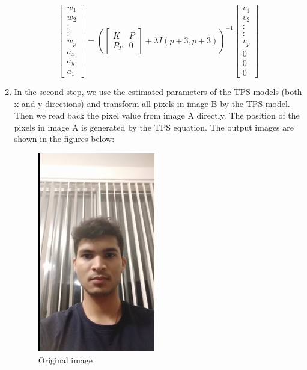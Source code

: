 \documentclass[conference]{IEEEtran}
\begin{document}
\begin{enumerate}
\begin{equation}
\begin{bmatrix}
w_1\\
w_2\\
:\\
:\\
w_p\\
a_x\\
a_y\\
a_1
\end{bmatrix}
=
(
\begin{bmatrix}
K & P \\
P_T & 0
\end{bmatrix}
+ \lambda I(p+3, p+3))^{-1}
\begin{bmatrix}
v_1\\
v_2\\
:\\
:\\
v_p\\
0\\
0\\
0
\end{bmatrix}
\end{equation}
\item In the second step, we use the estimated parameters of the TPS models (both x and y directions) and transform all pixels in image B by the TPS model. Then we read back the pixel value from image A directly. The position of the pixels in image A is generated by the TPS equation. The output images are shown in the figures below:
\begin{figure}[H]
\includegraphics[scale=0.4]{1.png}
\centering
\caption{Original image}
\end{figure}
\begin{figure}[H]

\end{figure}
\end{enumerate}
\end{document}
